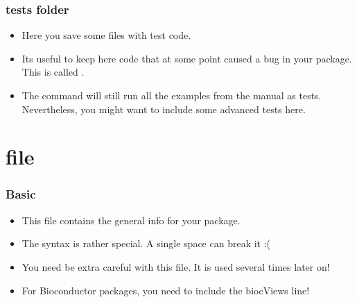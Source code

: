 \begin{frame}[allowframebreaks]
  \frametitle{tests folder}
  \begin{itemize}
  \item Here you save some  files with test code.
  \item Its useful to keep here code that at some point caused a bug in your package. This is called .
  \item The  command will still run all the examples from the manual as tests. Nevertheless, you might want to include some advanced tests here.
  \end{itemize}
\end{frame}

\section{ file}

\begin{frame}[allowframebreaks]
  \frametitle{Basic}
  \begin{itemize}
  \item This file contains the general info for your package.
  \item The syntax is rather special. A single space can break it :(
  \item You need be extra careful with this file. It is used several times later on!
  \item For Bioconductor packages, you need to include the \alert{biocViews} line!
  \end{itemize}
\end{frame}

